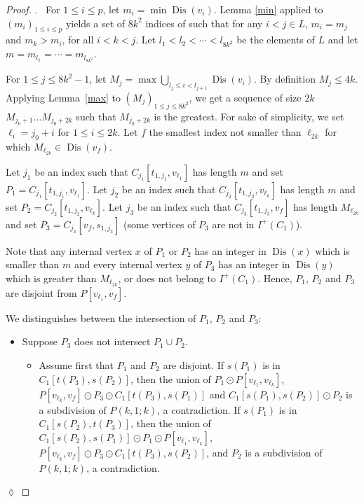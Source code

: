 \documentclass[utf8,10pt]{article}
\theoremstyle{plain}
\theoremstyle{definition}
\theoremstyle{remark}
\newenvironment{subproof}{\par\noindent {\it Subproof}.\ }{\hfill$\lozenge$\par\vspace{11pt}}
\DeclareMathOperator{\Dis}{Dis}
\begin{document}
\begin{proof}
\begin{subproof}
For $1\leq i\leq p$, let $m_i = \min \Dis(v_i)$. 
Lemma \ref{min} applied to $(m_i)_{1\leq i\leq p}$ yields  a set of $8k^2$ indices of such that 
for any $i< j \in L$,  $m_i=m_j$ and $m_k > m_i$, for all $i< k < j$.
Let $l_1 < l_2 < \cdots < l_{8k^2}$ be the elements of $L$ and let $m= m_{l_1} = \cdots = m_{l_{8k^2}}$.


For $1\leq j\leq 8k^2-1$, let $M_j = \max \bigcup_{l_j\leq i < l_{j+1}} \Dis(v_i)$.
By definition $M_j\leq 4k$.
Applying Lemma~\ref{max} to $(M_j)_{1\leq j\leq 8k^2}$,  we get a sequence of size $2k$ $M_{j_0+1} \dots M_{j_0+{2k}}$ such that $M_{j_0+{2k}}$ is the greatest. For sake of simplicity, we set $\ell_i =j_0+i$ for $1\leq i\leq 2k$.
Let $f$ the smallest index not smaller than $\ell_{2k}$ for which $M_{\ell_{2k}} \in \Dis (v_f)$. 

Let $j_1$ be an index such that $C_{j_1}[t_{1,j_1},v_{\ell_1}]$ has length $m$ and set $P_1=C_{j_1}[t_{1,j_1},v_{\ell_1}]$.
Let $j_2$ be an index such that $C_{j_2}[t_{1,j_2},v_{\ell_k}]$ has length $m$ and set $P_2=C_{j_2}[t_{1,j_2},v_{\ell_k}]$.
Let $j_3$ be an index such that  $C_{j_3}[t_{1,j_3},v_{f}]$ has length $M_{\ell_{2k}}$ and set $P_3=C_{j_3}[v_f, s_{1,j_3}]$ (some vertices of $P_3$ are not in $I^+(C_1)$).

Note that any internal vertex $x$ of $P_1$ or $P_2$ has an integer in $\Dis(x)$
which is smaller than $m$ and every internal vertex $y$ of $P_3$ has an integer in $\Dis(y)$ which
is greater than $M_{\ell_{2k}}$, or does not belong to $I^+(C_1)$. Hence, 
$P_1$, $P_2$ and $P_3$ are disjoint from $P[v_{\ell_1},v_f]$. 


We distinguishes between the intersection of $P_1$, $P_2$ and $P_3$:

\begin{itemize}
	\item Suppose $P_3$ does not intersect $P_1 \cup P_2$.
	\begin{itemize}
		\item Assume first that $P_1$ and $P_2$ are disjoint. If $s(P_1)$ is in $C_1[t(P_3), s(P_2)]$, then the union of  $P_1 \odot P[v_{\ell_1}, v_{\ell_k}]$, $P[v_{\ell_k}, v_f] \odot P_3\odot C_1[t(P_3), s(P_1)]$ and $C_1[s(P_1), s(P_2)]\odot P_2$ is a subdivision of $P(k,1;k)$, a contradiction.
		 If $s(P_1)$ is in $C_1[ s(P_2), t(P_3)]$, then the union of  $C_1[s(P_2), s(P_1)]\odot P_1\odot P[v_{\ell_1}, v_{\ell_k}]$, $P[v_{\ell_k}, v_f]\odot  P_3\odot C_1[t(P_3), s(P_2)]$, and  $P_2$ is a subdivision of $P(k,1;k)$, a contradiction.
	

\end{itemize}
\end{itemize}
\end{subproof}
\end{proof}
\end{document}
